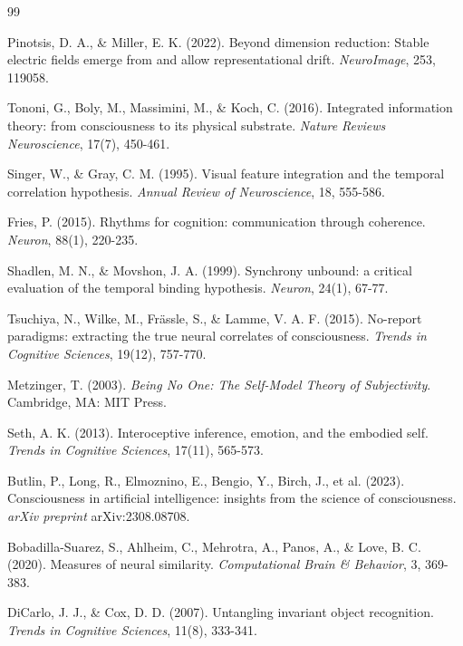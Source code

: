 \begin{thebibliography}{99}

 Pinotsis, D. A., \& Miller, E. K. (2022). Beyond dimension reduction: Stable electric fields emerge from and allow representational drift. \textit{NeuroImage}, 253, 119058.

 Tononi, G., Boly, M., Massimini, M., \& Koch, C. (2016). Integrated information theory: from consciousness to its physical substrate. \textit{Nature Reviews Neuroscience}, 17(7), 450-461.

 Singer, W., \& Gray, C. M. (1995). Visual feature integration and the temporal correlation hypothesis. \textit{Annual Review of Neuroscience}, 18, 555-586.

 Fries, P. (2015). Rhythms for cognition: communication through coherence. \textit{Neuron}, 88(1), 220-235.

 Shadlen, M. N., \& Movshon, J. A. (1999). Synchrony unbound: a critical evaluation of the temporal binding hypothesis. \textit{Neuron}, 24(1), 67-77.

 Tsuchiya, N., Wilke, M., Fr\"{a}ssle, S., \& Lamme, V. A. F. (2015). No-report paradigms: extracting the true neural correlates of consciousness. \textit{Trends in Cognitive Sciences}, 19(12), 757-770.

 Metzinger, T. (2003). \textit{Being No One: The Self-Model Theory of Subjectivity}. Cambridge, MA: MIT Press.

 Seth, A. K. (2013). Interoceptive inference, emotion, and the embodied self. \textit{Trends in Cognitive Sciences}, 17(11), 565-573.

 Butlin, P., Long, R., Elmoznino, E., Bengio, Y., Birch, J., et al. (2023). Consciousness in artificial intelligence: insights from the science of consciousness. \textit{arXiv preprint} arXiv:2308.08708.

 Bobadilla-Suarez, S., Ahlheim, C., Mehrotra, A., Panos, A., \& Love, B. C. (2020). Measures of neural similarity. \textit{Computational Brain \& Behavior}, 3, 369-383.

 DiCarlo, J. J., \& Cox, D. D. (2007). Untangling invariant object recognition. \textit{Trends in Cognitive Sciences}, 11(8), 333-341.


\end{thebibliography}
